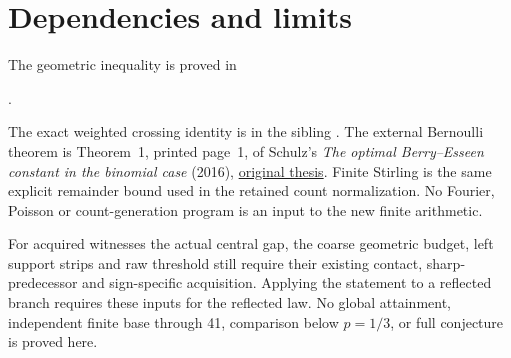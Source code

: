 \documentclass[11pt]{article}
\begin{document}
\section*{Dependencies and limits}
The geometric inequality is proved in\par\noindent
{}.\par\noindent
The exact weighted crossing identity is in the sibling .
The external Bernoulli theorem is Theorem~1, printed page~1, of Schulz's
\emph{The optimal Berry--Esseen constant in the binomial case} (2016),
\href{https://d-nb.info/1197702695/34}{original thesis}.
Finite Stirling is the same explicit remainder bound used in the retained
count normalization. No Fourier, Poisson or count-generation program is
an input to the new finite arithmetic.

For acquired witnesses the actual central gap, the coarse geometric budget,
left support strips and raw threshold still require their existing
contact, sharp-predecessor and sign-specific acquisition. Applying the
statement to a reflected branch requires these inputs for the reflected
law. No global attainment, independent finite base through 41, comparison
below $p=1/3$, or full conjecture is proved here.
\end{document}
